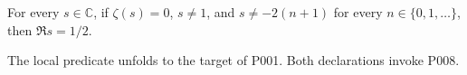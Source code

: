 
\begin{formalstatement}\label{pn:P002}
For every $s\in\mathbb C$, if $\zeta(s)=0$, $s\ne1$, and $s\ne-2(n+1)$ for every $n\in\{0,1,\ldots\}$, then $\Re s=1/2$.
\end{formalstatement}
The local predicate  unfolds to the target of P001. Both declarations invoke P008.
